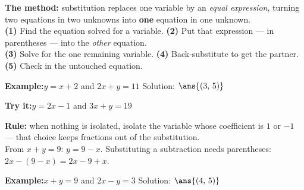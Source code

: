 \documentclass[12pt]{article}
\begin{document}


\begin{formulabox}
\textbf{The method:} substitution replaces one variable by an \emph{equal
expression}, turning two equations in two unknowns into \textbf{one} equation in
one unknown.\\[3pt]
\textbf{(1)} Find the equation solved for a variable. \quad
\textbf{(2)} Put that expression --- in parentheses --- into the \emph{other}
equation.\\
\textbf{(3)} Solve for the one remaining variable. \quad
\textbf{(4)} Back-substitute to get the partner. \quad
\textbf{(5)} Check in the untouched equation.
\end{formulabox}

\begin{examplebox}
\textbf{Example:}\quad $y = x + 2$ \; and \; $2x + y = 11$
Solution: $\ans{(3,\,5)}$
\end{examplebox}

\begin{tryitbox}
\textbf{Try it:}\quad $y = 2x - 1$ \; and \; $3x + y = 19$\\[2pt]
\end{tryitbox}


\begin{formulabox}
\textbf{Rule:} when nothing is isolated, isolate the variable whose coefficient
is $1$ or $-1$ --- that choice keeps fractions out of the substitution.\\[3pt]
From $x + y = 9$: \; $y = 9 - x$. \quad Substituting a subtraction needs
parentheses: $2x - (9 - x) = 2x - 9 + x$.
\end{formulabox}

\begin{examplebox}
\textbf{Example:}\quad $x + y = 9$ \; and \; $2x - y = 3$
Solution: $\ans{(4,\,5)}$
\end{examplebox}
\end{document}
